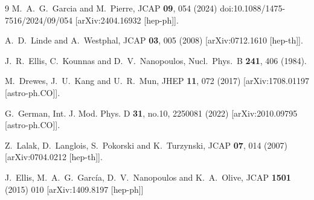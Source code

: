 \documentclass[aps,prev,twocolumn,preprintnumbers,floatfix,nofootinbib]{revtex4-1}
\begin{document}
\begin{thebibliography}{9}
M.~A.~G.~Garcia and M.~Pierre,
JCAP \textbf{09}, 054 (2024)
doi:10.1088/1475-7516/2024/09/054
[arXiv:2404.16932 [hep-ph]].

A.~D.~Linde and A.~Westphal,
JCAP \textbf{03}, 005 (2008)
[arXiv:0712.1610 [hep-th]].

 
 J.~R.~Ellis, C.~Kounnas and D.~V.~Nanopoulos,
  Nucl.\ Phys.\ B {\bf 241}, 406 (1984).



M.~Drewes, J.~U.~Kang and U.~R.~Mun,
JHEP \textbf{11}, 072 (2017)
[arXiv:1708.01197 [astro-ph.CO]].

G.~German,
Int. J. Mod. Phys. D \textbf{31}, no.10, 2250081 (2022)
[arXiv:2010.09795 [astro-ph.CO]].

Z.~Lalak, D.~Langlois, S.~Pokorski and K.~Turzynski,
JCAP \textbf{07}, 014 (2007)
[arXiv:0704.0212 [hep-th]].

  J.~Ellis, M.~A.~G.~Garc\'ia, D.~V.~Nanopoulos and K.~A.~Olive,
  JCAP {\bf 1501} (2015) 010
  [arXiv:1409.8197 [hep-ph]]














\end{thebibliography}
\end{document}
